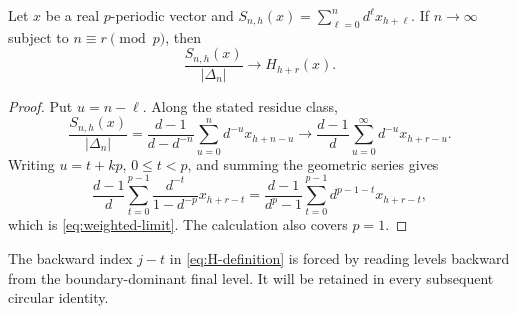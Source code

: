 \begin{lemma}
\label{lem:weighted-limit}
Let $x$ be a real $p$-periodic vector and
$S_{n,h}(x)=\sum_{\ell=0}^n d^\ell x_{h+\ell}$.  If
$n\to\infty$ subject to $n\equiv r\pmod p$, then
\begin{equation}
 \frac{S_{n,h}(x)}{|\Delta_n|}\longrightarrow H_{h+r}(x).
 \label{eq:weighted-limit}
\end{equation}
\end{lemma}

\begin{proof}
Put $u=n-\ell$.  Along the stated residue class,
\[
 \frac{S_{n,h}(x)}{|\Delta_n|}
 =\frac{d-1}{d-d^{-n}}
   \sum_{u=0}^n d^{-u}x_{h+n-u}
 \longrightarrow \frac{d-1}{d}
   \sum_{u=0}^{\infty}d^{-u}x_{h+r-u}.
\]
Writing $u=t+kp$, $0\leq t<p$, and summing the geometric series gives
\[
 \frac{d-1}{d}
 \sum_{t=0}^{p-1}\frac{d^{-t}}{1-d^{-p}}x_{h+r-t}
 =\frac{d-1}{d^p-1}\sum_{t=0}^{p-1}
 d^{p-1-t}x_{h+r-t},
\]
which is \eqref{eq:weighted-limit}.  The calculation also covers $p=1$.
\end{proof}

The backward index $j-t$ in \eqref{eq:H-definition} is forced by reading
levels backward from the boundary-dominant final level.  It will be retained
in every subsequent circular identity.
